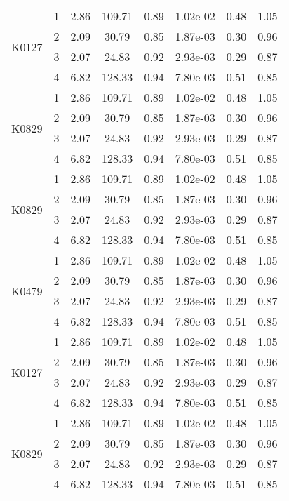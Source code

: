 \begin{longtable}{|c|c|c|c|c|c|c|c|}
\multirow{4}{*}{K0127} & 1 & 2.86 & 109.71 & 0.89 & 1.02e-02 & 0.48 & 1.05 \\
& 2 & 2.09 & 30.79 & 0.85 & 1.87e-03 & 0.30 & 0.96 \\
& 3 & 2.07 & 24.83 & 0.92 & 2.93e-03 & 0.29 & 0.87 \\
& 4 & 6.82 & 128.33 & 0.94 & 7.80e-03 & 0.51 & 0.85 \\ \hline

\multirow{4}{*}{K0829} & 1 & 2.86 & 109.71 & 0.89 & 1.02e-02 & 0.48 & 1.05 \\
& 2 & 2.09 & 30.79 & 0.85 & 1.87e-03 & 0.30 & 0.96 \\
& 3 & 2.07 & 24.83 & 0.92 & 2.93e-03 & 0.29 & 0.87 \\
& 4 & 6.82 & 128.33 & 0.94 & 7.80e-03 & 0.51 & 0.85 \\ \hline

\multirow{4}{*}{K0829} & 1 & 2.86 & 109.71 & 0.89 & 1.02e-02 & 0.48 & 1.05 \\
& 2 & 2.09 & 30.79 & 0.85 & 1.87e-03 & 0.30 & 0.96 \\
& 3 & 2.07 & 24.83 & 0.92 & 2.93e-03 & 0.29 & 0.87 \\
& 4 & 6.82 & 128.33 & 0.94& 7.80e-03 & 0.51 & 0.85 \\ \hline

\multirow{4}{*}{K0479} & 1 & 2.86 & 109.71 & 0.89 & 1.02e-02 & 0.48 & 1.05 \\
& 2 & 2.09 & 30.79 & 0.85 & 1.87e-03 & 0.30 & 0.96 \\
& 3 & 2.07 & 24.83 & 0.92 & 2.93e-03 & 0.29 & 0.87 \\
& 4 & 6.82 & 128.33 & 0.94& 7.80e-03 & 0.51 & 0.85 \\ \hline


\multirow{4}{*}{K0127} & 1 & 2.86 & 109.71 & 0.89 & 1.02e-02 & 0.48 & 1.05 \\
& 2 & 2.09 & 30.79 & 0.85 & 1.87e-03 & 0.30 & 0.96 \\
& 3 & 2.07 & 24.83 & 0.92 & 2.93e-03 & 0.29 & 0.87 \\
& 4 & 6.82 & 128.33 & 0.94 & 7.80e-03 & 0.51 & 0.85 \\ \hline

\multirow{4}{*}{K0829} & 1 & 2.86 & 109.71 & 0.89 & 1.02e-02 & 0.48 & 1.05 \\
& 2 & 2.09 & 30.79 & 0.85 & 1.87e-03 & 0.30 & 0.96 \\
& 3 & 2.07 & 24.83 & 0.92 & 2.93e-03 & 0.29 & 0.87 \\
& 4 & 6.82 & 128.33 & 0.94 & 7.80e-03 & 0.51 & 0.85 \\ \hline


\end{longtable}
